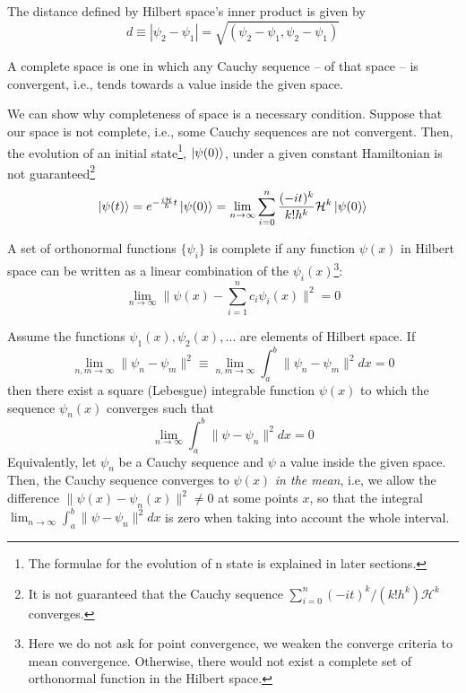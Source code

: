 \begin{definition}[Distance]
    The distance defined by Hilbert space's inner product is given by
    \begin{equation}
      d \equiv \left|\psi_{2} - \psi_{1}\right| = \sqrt{(\psi_{2}-\psi_{1},\psi_{2}-\psi_{1})}  
    \end{equation}
\end{definition}
\begin{definition}
A complete space is one in which any Cauchy sequence -- of that space -- is convergent, i.e., tends towards a value inside the given space.
\end{definition}
We can show why completeness of space is a necessary condition. Suppose that our space is not complete, i.e., some Cauchy sequences are not convergent. Then, the evolution of an initial state\footnote{The formulae for the evolution of n state is explained in later sections.}, $\ket{\psi(0)}$, under a given constant Hamiltonian is not guaranteed\footnote{It is not guaranteed that the Cauchy sequence $\sum_{i = 0}^{n}(-it)^{k} / \left(k!h^{k}\right)\mathcal{H}^{k}$ converges.}
\begin{equation}
    \ket{\psi(t)} = e^{-\frac{i\mathcal{H}}{\hbar}t}\ket{\psi(0)} = \lim_{n \to \infty} \sum_{i = 0}^{n}\frac{(-it)^{k}}{k!h^{k}}\mathcal{H}^{k}\ket{\psi(0)}
\end{equation}
\begin{definition}
A set of orthonormal functions $\{\psi_{i}\}$ is complete if any function $\psi(x)$ in Hilbert space can be written as a linear combination of the $\psi_{i}(x)$\footnote{Here we do not ask for point convergence, we weaken the converge criteria to mean convergence. Otherwise, there would not exist a complete set of orthonormal function in the Hilbert space.}:
\begin{equation}
    \lim_{n\to \infty}\| \psi(x) - \sum_{i=1}^{n}c_{i}\psi_{i}(x)\|^{2} = 0
\end{equation}
\end{definition}
\begin{theorem}
Assume the functions $\psi_{1}(x),\psi_{2}(x),\ldots$ are elements of Hilbert space. If
\begin{equation}
    \lim_{n,m\to\infty} \lVert \psi_{n} - \psi_{m}\rVert^{2} \equiv \lim_{n,m\to \infty} \int_{a}^{b} \|\psi_{n} - \psi_{m}\|^{2}dx = 0
\end{equation}
then there exist a square (Lebesgue) integrable function $\psi(x)$ to which the sequence $\psi_{n}(x)$ converges such that 
\begin{equation}
    \lim_{n\to \infty} \int_{a}^{b} \|\psi - \psi_{n}\|^{2}dx = 0
\end{equation}
Equivalently, let $\psi_{n}$ be a Cauchy sequence and $\psi$ a value inside the given space. Then, the Cauchy sequence converges to $\psi(x)$ \textit{in the mean}, i.e, we allow the difference $\|\psi(x) - \psi_{n}(x)\|^{2}\neq 0$ at some points $x$, so that the integral $\lim_{n\to \infty} \int_{a}^{b} \|\psi - \psi_{n}\|^{2}dx$ is zero when taking into account the whole interval.
\end{theorem}
